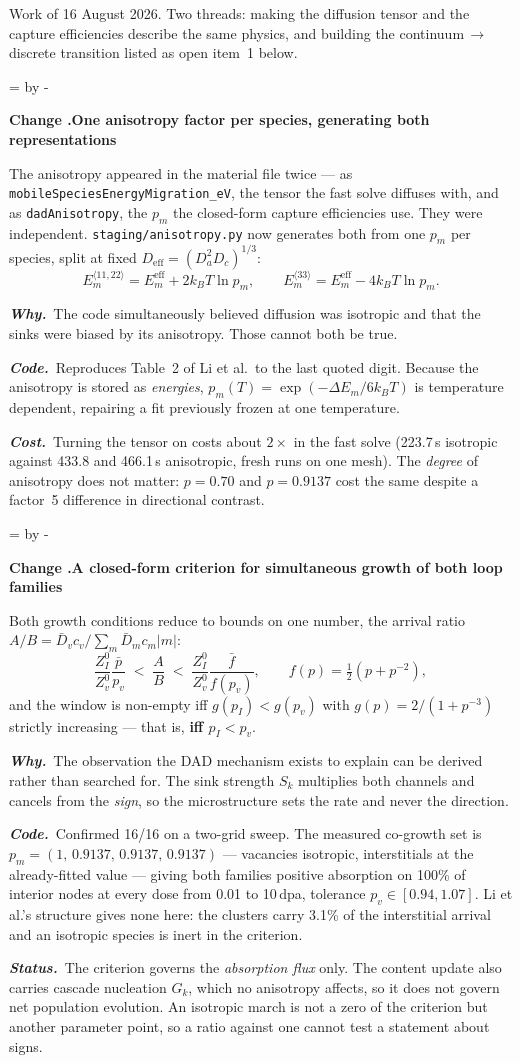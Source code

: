 \documentclass[11pt,a4paper]{article}
\newcommand{\code}[1]{\texttt{\small #1}}
\newcommand{\needlines}[1]{%
  \par\dimen0=\pagegoal \advance\dimen0 by -\pagetotal
  \ifdim\dimen0<#1\baselineskip \newpage \fi}
\newcounter{chg}
\newcommand{\change}[1]{%
  \needlines{4}%
  \refstepcounter{chg}%
  \par\medskip\noindent
  {\bfseries\boldmath Change \thechg.\quad #1}%
  \par\nobreak\smallskip}
\newcommand{\why}[1]{\par\noindent\textbf{\itshape Why.}\ #1\par}
\newcommand{\impact}[1]{\par\noindent\textbf{\itshape Code.}\ #1\par}
\newcommand{\cost}[1]{\par\noindent\textbf{\itshape Cost.}\ #1\par}
\newcommand{\status}[1]{\par\noindent\textbf{\itshape Status.}\ #1\par}
\begin{document}
Work of 16 August 2026. Two threads: making the diffusion tensor and the
capture efficiencies describe the same physics, and building the
continuum\,$\rightarrow$\,discrete transition listed as open item~1 below.

\change{One anisotropy factor per species, generating both representations}
\label{chg:aniso-one-source}
The anisotropy appeared in the material file twice --- as
\code{mobileSpeciesEnergyMigration\_eV}, the tensor the fast solve diffuses
with, and as \code{dadAnisotropy}, the $p_m$ the closed-form capture
efficiencies use. They were independent. \code{staging/anisotropy.py} now
generates both from one $p_m$ per species, split at fixed
$D_{\text{eff}}=(D_a^2D_c)^{1/3}$:
\[
E_m^{\langle 11,22\rangle}=E_m^{\text{eff}}+2k_BT\ln p_m,\qquad
E_m^{\langle 33\rangle}=E_m^{\text{eff}}-4k_BT\ln p_m .
\]
\why{The code simultaneously believed diffusion was isotropic and that the
sinks were biased by its anisotropy. Those cannot both be true.}
\impact{Reproduces Table~2 of Li et al.\ to the last quoted digit. Because the
anisotropy is stored as \emph{energies}, $p_m(T)=\exp(-\Delta E_m/6k_BT)$ is
temperature dependent, repairing a fit previously frozen at one temperature.}
\cost{Turning the tensor on costs about $2\times$ in the fast solve (223.7\,s
isotropic against 433.8 and 466.1\,s anisotropic, fresh runs on one mesh). The
\emph{degree} of anisotropy does not matter: $p=0.70$ and $p=0.9137$ cost the
same despite a factor~5 difference in directional contrast.}

\change{A closed-form criterion for simultaneous growth of both loop families}
\label{chg:cogrowth}
Both growth conditions reduce to bounds on one number, the arrival ratio
$A/B=\bar D_v c_v\big/\sum_m \bar D_m c_m|m|$:
\[
\frac{Z^0_I}{Z^0_v}\frac{\bar p}{p_v} \;<\; \frac{A}{B} \;<\;
\frac{Z^0_I}{Z^0_v}\frac{\bar f}{f(p_v)},\qquad f(p)=\tfrac12(p+p^{-2}),
\]
and the window is non-empty iff $g(p_I)<g(p_v)$ with $g(p)=2/(1+p^{-3})$
strictly increasing --- that is, \textbf{iff $p_I<p_v$}.
\why{The observation the DAD mechanism exists to explain can be derived rather
than searched for. The sink strength $S_k$ multiplies both channels and cancels
from the \emph{sign}, so the microstructure sets the rate and never the
direction.}
\impact{Confirmed 16/16 on a two-grid sweep. The measured co-growth set is
$p_m=(1,\,0.9137,\,0.9137,\,0.9137)$ --- vacancies isotropic, interstitials at
the already-fitted value --- giving both families positive absorption on 100\%
of interior nodes at every dose from 0.01 to 10\,dpa, tolerance
$p_v\in[0.94,1.07]$. Li et al.'s structure gives none here: the clusters carry
3.1\% of the interstitial arrival and an isotropic species is inert in the
criterion.}
\status{The criterion governs the \emph{absorption flux} only. The content
update also carries cascade nucleation $G_k$, which no anisotropy affects, so
it does not govern net population evolution. An isotropic march is not a zero
of the criterion but another parameter point, so a ratio against one cannot
test a statement about signs.}
\end{document}

